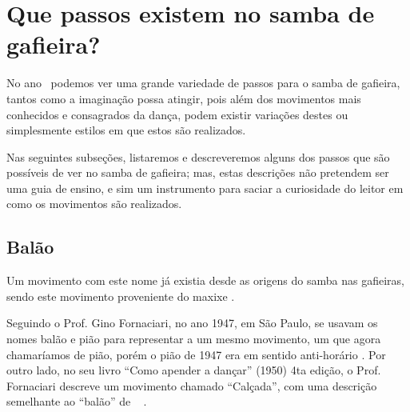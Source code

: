 
\section{Que passos existem no samba de gafieira?}

No ano \AnoLivro~podemos ver uma grande variedade de passos para o samba de gafieira,
tantos como a imaginação possa atingir, pois além dos movimentos mais conhecidos e  consagrados da dança,
podem existir variações  destes ou simplesmente estilos em que estos são realizados. 

Nas seguintes subseções, listaremos e descreveremos 
alguns dos passos que são possíveis de ver no samba de gafieira;
mas, estas descrições não pretendem ser uma guia de ensino,
e sim um instrumento para saciar a curiosidade do leitor em como os movimentos são realizados.\\

\subsection{Balão} 
\label{def:PassoBalao}
Um movimento com este nome já existia desde as origens do samba nas gafieiras, 
sendo este movimento proveniente do maxixe \cite[pp. 142]{perna2002samba} 
\cite[pp. 93]{efege1974maxixe} \cite[pp. 465]{marcondes1977enciclopedia}.



Seguindo o Prof. Gino Fornaciari, no ano 1947,  em São Paulo, se usavam os nomes balão e pião
para representar a um mesmo movimento, um que agora chamaríamos de pião, 
porém o pião de 1947 era em sentido anti-horário \cite[pp. 68-72]{fornaciari1947aprender}.
Por outro lado, no seu livro ``Como apender a dançar'' (1950) 4ta edição,
o Prof. Fornaciari descreve um movimento  chamado ``Calçada'', com uma descrição semelhante 
ao ``balão'' de \AnoLivro~ \cite[pp. 162]{fornaciari1950aprender}.

